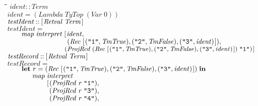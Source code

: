 \documentclass[10pt]{article}
\newlength{\lwidth}\setlength{\lwidth}{4.5cm}
\newlength{\cwidth}\setlength{\cwidth}{8mm} %
\newcommand{\Conid}[1]{\mathit{#1}}
\newcommand{\Varid}[1]{\mathit{#1}}
\begin{document}
\begin{tabbing}
\qquad\=\hspace{\lwidth}\=\hspace{\cwidth}\=\+\kill
${\Varid{ident}\mathbin{::}\Conid{Term}}$\\
${\Varid{ident}\mathrel{=}(\Conid{Lambda}\;\Conid{TyTop}\;(\Conid{Var}\;\mathrm{0}))}$\\
${}$\\
${\Varid{testIdent}\mathbin{::}[\mskip1.5mu \Conid{Retval}\;\Conid{Term}\mskip1.5mu]}$\\
${\Varid{testIdent}\mathrel{=}}$\\
${\hskip2.00em\relax\Varid{map}\;\Varid{interpret}\;[\mskip1.5mu \Varid{ident},}$\\
${\hskip2.00em\relax\phantom{\Varid{map}\;\Varid{interpret}\;[\mskip1.5mu \mbox{}}(\Conid{Rec}\;[\mskip1.5mu (\text{\tt \char34 1\char34},\Conid{TmTrue}),(\text{\tt \char34 2\char34},\Conid{TmFalse}),(\text{\tt \char34 3\char34},\Varid{ident})\mskip1.5mu]),}$\\
${\hskip2.00em\relax\phantom{\Varid{map}\;\Varid{interpret}\;[\mskip1.5mu \mbox{}}(\Conid{ProjRcd}\;(\Conid{Rec}\;[\mskip1.5mu (\text{\tt \char34 1\char34},\Conid{TmTrue}),(\text{\tt \char34 2\char34},\Conid{TmFalse}),(\text{\tt \char34 3\char34},\Varid{ident})\mskip1.5mu])\;\text{\tt \char34 1\char34})\mskip1.5mu]}$\\
${}$\\
${\Varid{testRecord}\mathbin{::}[\mskip1.5mu \Conid{Retval}\;\Conid{Term}\mskip1.5mu]}$\\
${\Varid{testRecord}\mathrel{=}}$\\
${\hskip2.00em\relax\mathbf{let}\;\Varid{r}\mathrel{=}(\Conid{Rec}\;[\mskip1.5mu (\text{\tt \char34 1\char34},\Conid{TmTrue}),(\text{\tt \char34 2\char34},\Conid{TmFalse}),(\text{\tt \char34 3\char34},\Varid{ident})\mskip1.5mu])\;\mathbf{in}}$\\
${\hskip2.00em\relax\phantom{\mathbf{let}\;\mbox{}}\Varid{map}\;\Varid{interpret}\;}$\\
${\hskip2.00em\relax\phantom{\mathbf{let}\;\mbox{}}\phantom{\Varid{map}\;\mbox{}}[\mskip1.5mu (\Conid{ProjRcd}\;\Varid{r}\;\text{\tt \char34 1\char34}),}$\\
${\hskip2.00em\relax\phantom{\mathbf{let}\;\mbox{}}\phantom{\Varid{map}\;\mbox{}}\phantom{[\mskip1.5mu \mbox{}}(\Conid{ProjRcd}\;\Varid{r}\;\text{\tt \char34 3\char34}),}$\\
${\hskip2.00em\relax\phantom{\mathbf{let}\;\mbox{}}\phantom{\Varid{map}\;\mbox{}}\phantom{[\mskip1.5mu \mbox{}}(\Conid{ProjRcd}\;\Varid{r}\;\text{\tt \char34 4\char34}),}$\\

\end{tabbing}
\end{document}
